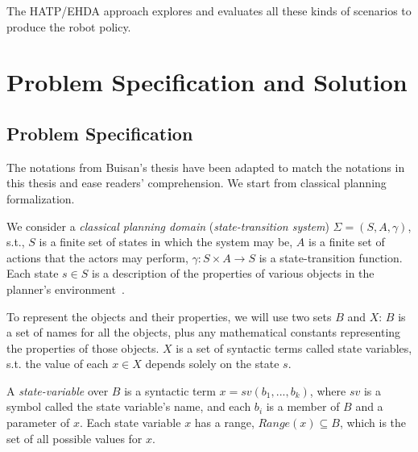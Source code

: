 The HATP/EHDA approach explores and evaluates all these kinds of scenarios to produce the robot policy.


\section{Problem Specification and Solution}

\subsection{Problem Specification}

The notations from Buisan's thesis have been adapted to match the notations in this thesis and ease readers' comprehension. We start from classical planning formalization.

We consider a \textit{classical planning domain} (\textit{state-transition system}) $\Sigma = (S, A,\gamma)$, s.t., $S$ is a finite set of states in which the system may be, $A$ is a finite set of actions that the actors may perform, $\gamma: S \times A \rightarrow S$ is a state-transition function. Each state $s \in S$ is a description of the properties of various objects in the planner's environment~\cite{ghallab2016automated}. 

To represent the objects and their properties, we will use two sets $B$ and $X$: $B$ is a set of names for all the objects, plus any mathematical constants representing the properties of those objects. $X$ is a set of syntactic terms called state variables, s.t. the value of each $x \in X$ depends solely on the state $s$.

A \textit{state-variable} over $B$ is a syntactic term $x = sv(b_1, ..., b_k)$, where $sv$ is a symbol called the state variable's name, and each $b_i$ is a member of $B$ and a parameter of $x$. Each state variable $x$ has a range, $\textit{Range}(x) \subseteq B$, which is the set of all possible values for $x$.


